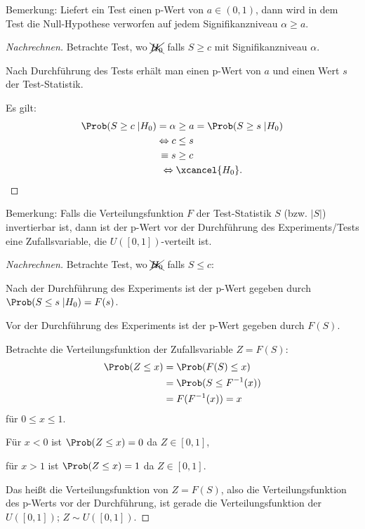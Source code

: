 \documentclass{tstextbook}
\begin{document}
\begin{remark}
	Bemerkung: Liefert ein Test einen p-Wert von $ a\in(0,1) $, dann wird in dem Test die Null-Hypothese verworfen auf jedem Signifikanzniveau $ \alpha\ge a $.
\end{remark}

\begin{proof}[Nachrechnen]
	Betrachte Test, wo $ \xcancel{H_0} $ falls $ S\ge c $ mit Signifikanzniveau $ \alpha $. 
	
	Nach Durchführung des Tests erhält man einen p-Wert von $ a $ und einen Wert $ s $ der Test-Statistik. 
	
	Es gilt: 
	\[
	\begin{aligned}
		\Prob(S\ge c\; |H_0) = \alpha & \ge a = \Prob(S\ge s\; |H_0) \\
		\Leftrightarrow c & \le s \\
		\equiv s & \ge c \\
		\Leftrightarrow \; & \xcancel{H_0}.
	\end{aligned}
	\]
\end{proof}

\begin{remark}
	Bemerkung: Falls die Verteilungsfunktion $ F $ der Test-Statistik $ S $ (bzw. $ |S| $) invertierbar ist, dann ist der p-Wert vor der Durchführung des Experiments/Tests eine Zufallsvariable, die $ U([0,1]) $-verteilt ist.
\end{remark}

\begin{proof}[Nachrechnen]
	Betrachte Test, wo $ \xcancel{H_0} $ falls $ S\le c $: 
	
	Nach der Durchführung des Experiments ist der p-Wert gegeben durch $ \Prob(S\le s \; |H_0)=F(s) $. 
	
	Vor der Durchführung des Experiments ist der p-Wert gegeben durch $ F(S) $.
	
	Betrachte die Verteilungsfunktion der Zufallsvariable $ Z=F(S) $:
	\[
	\begin{aligned}
		\Prob(Z\le x) & = \Prob(F(S)\le x) \\
		& = \Prob(S\le F^{-1}(x)) \\
		& = F(F^{-1}(x))=x
	\end{aligned}
	\]
	für $ 0\le x \le 1 $. 
	
	Für $ x<0 $ ist $ \Prob(Z\le x)=0 $ da $ Z\in[0,1] $,
	
	für $ x>1 $ ist $ \Prob(Z\le x)=1 $ da $ Z\in[0,1] $.
	
	Das heißt die Verteilungsfunktion von $ Z=F(S) $, also die Verteilungsfunktion des p-Werts vor der Durchführung, ist gerade die Verteilungsfunktion der $ U([0,1]) $; $ Z\sim U([0,1]) $.
\end{proof}
\end{document}
